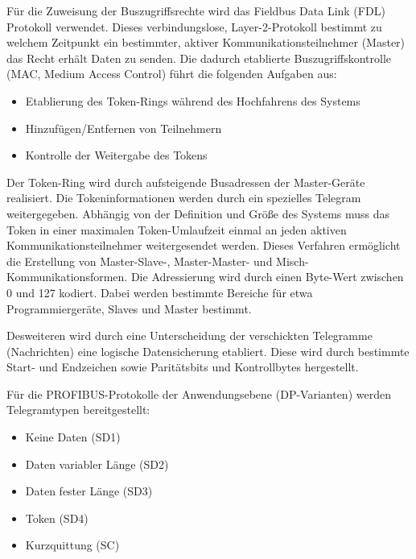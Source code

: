 Für die Zuweisung der Buszugriffsrechte wird das Fieldbus Data Link (FDL) Protokoll verwendet. Dieses verbindungslose, Layer-2-Protokoll bestimmt zu welchem Zeitpunkt ein bestimmter, aktiver Kommunikationsteilnehmer (Master) das Recht erhält Daten zu senden. Die dadurch etablierte Buszugriffskontrolle (MAC, Medium Access Control) führt die folgenden Aufgaben aus:
\begin{itemize}
\item Etablierung des Token-Rings während des Hochfahrens des Systems
\item Hinzufügen/Entfernen von Teilnehmern
\item Kontrolle der Weitergabe des Tokens
\end{itemize}

Der Token-Ring wird durch aufsteigende Busadressen der Master-Geräte realisiert. Die Tokeninformationen werden durch ein spezielles Telegram weitergegeben. Abhängig von der Definition und Größe des Systems muss das Token in einer maximalen Token-Umlaufzeit einmal an jeden aktiven Kommunikationsteilnehmer weitergesendet werden. Dieses Verfahren ermöglicht die Erstellung von Master-Slave-, Master-Master- und Misch-Kommunikationsformen. Die Adressierung wird durch einen Byte-Wert zwischen 0 und 127 kodiert. Dabei werden bestimmte Bereiche für etwa Programmiergeräte, Slaves und Master bestimmt.

Desweiteren wird durch eine Unterscheidung der verschickten Telegramme (Nachrichten) eine logische Datensicherung etabliert. Diese wird durch bestimmte Start- und Endzeichen sowie Paritätsbits und Kontrollbytes hergestellt. 

Für die PROFIBUS-Protokolle der Anwendungsebene (DP-Varianten) werden Telegramtypen bereitgestellt:
\begin{itemize}
\item Keine Daten (SD1)
\item Daten variabler Länge (SD2)
\item Daten fester Länge (SD3)
\item Token (SD4)
\item Kurzquittung (SC)
\end{itemize}

